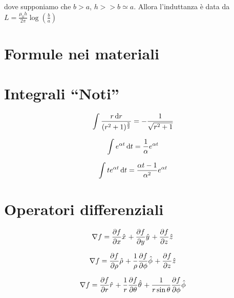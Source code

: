\documentclass[a4paper,10pt]{article}
\begin{document}
\begin{multicols}{2}
{  dove supponiamo che $b > a$, $h >> b \simeq a$. Allora l'induttanza è
  data da $L = \frac{\mu_0 h}{2 \pi} \log(\frac{b}{a})$
}

\section{Formule nei materiali}


\section{Integrali ``Noti''}
\begin{equation*}
  \int \frac{r \,\mathrm d r}{(r^2+1)^{\frac{3}{2}}} = - \frac{1}{\sqrt{r^2 + 1}}
\end{equation*}

\begin{equation*}
  \int e^{\alpha t} \,\mathrm d t = \frac{1}{\alpha} e^{\alpha t}
\end{equation*}

\begin{equation*}
  \int t e^{\alpha t} \,\mathrm d t = \frac{\alpha t - 1}{\alpha^2} e^{\alpha t}
\end{equation*}

\section{Operatori differenziali}

  \begin{equation*}
    \grad f = \dep{f}{x} \hat{x} +
    \dep{f}{y} \hat{y} +
    \dep{f}{z} \hat{z}
  \end{equation*}
  
  \begin{equation*}
    \grad f = \dep{f}{\rho} \hat{\rho} +
    \frac{1}{\rho} \dep{f}{\phi} \hat{\phi} +
    \dep{f}{z} \hat{z}
  \end{equation*}
  
  \begin{equation*}
    \grad f = \dep{f}{r} \hat{r} +
    \frac{1}{r} \dep{f}{\theta} \hat{\theta} +
    \frac{1}{r \sin \theta} \dep{f}{\phi} \hat{\phi}
  \end{equation*}
  

\end{multicols}
\end{document}
